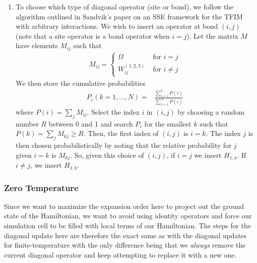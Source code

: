 \documentclass[12pt]{article}
\begin{document}
\begin{enumerate}
\begin{subequations}
\begin{align}
            P_{H_{[1,b]_p}} = & \frac{ - 4N_b\delta_b + \sum_{ij} V_{ij} + 4C_{ij}}{N\Omega - 4N_b\delta_b + \sum_{ij} V_{ij} + 4C_{ij}}.
        \end{align}
    \end{subequations}
    \item To choose which type of diagonal operator (site or bond), we follow the algorithm outlined in Sandvik's paper on an SSE framework for the TFIM with arbitrary interactions. 
    We wish to insert an operator at bond $(i,j)$ (note that a site operator is a bond operator when $i=j$). 
    Let the matrix $M$ have elements $M_{ij}$ such that
    \begin{align} \label{eq:choices}
        M_{ij} = \begin{cases}
            \Omega & \text{ for } i = j \\
             W^{(1,2,3)}_{ij} & \text{ for } i \neq j
        \end{cases}
    \end{align}
    We then store the cumulative probabilities
    \begin{align}
        P_c(k=1,...,N) =& \frac{\sum_{i=1}^k P(i)}{\sum_{i=1}^N P(i)}
    \end{align}
    where $P(i) = \sum_j M_{ij}$.
    Select the index $i$ in $(i,j)$ by choosing a random number $R$ between 0 and 1 and search $P_c$ for the smallest $k$ such that $P(k) = \sum_j M_{kj} \geq R$. 
    Then, the first index of $(i,j)$ is $i = k$.
    The index $j$ is then chosen probabilistically by noting that the relative probability for $j$ given $i=k$ is $M_{kj}$.
    So, given this choice of $(i,j)$, if $i = j$ we insert $H_{1,a}$. 
    If $i \neq j$, we insert $H_{1,b}$.
\end{enumerate}

\subsubsection{Zero Temperature}

Since we want to maximize the expansion order here to project out the ground state of the Hamiltonian, we want to avoid using identity operators and force our simulation cell to be filled with local terms of our Hamiltonian.
The steps for the diagonal update here are therefore the exact same as with the diagonal updates for finite-temperature with the only difference being that we {\it always} remove the current diagonal operator and keep attempting to replace it with a new one.
\end{document}
